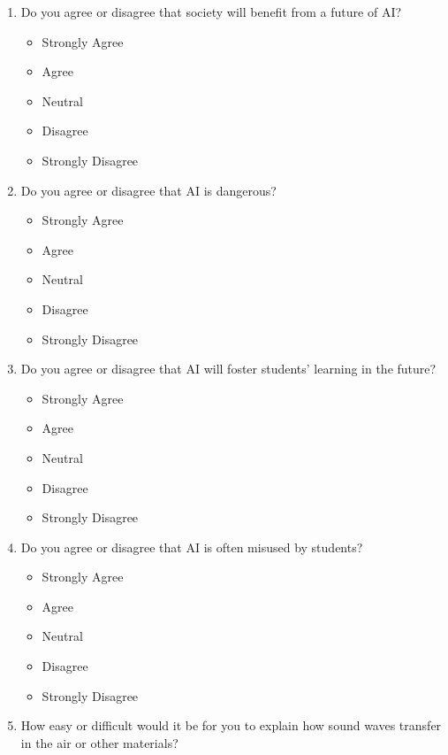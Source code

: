 \documentclass[
  12pt, %
]{article}
\providecommand{\tightlist}{%
  \setlength{\itemsep}{0pt}\setlength{\parskip}{0pt}}
\begin{document}
\begin{enumerate}
\def\labelenumi{\arabic{enumi}.}
\item
  Do you agree or disagree that society will benefit from a future of AI?

  \begin{itemize}
  \tightlist
  \item
    Strongly Agree
  \item
    Agree
  \item
    Neutral
  \item
    Disagree
  \item
    Strongly Disagree
  \end{itemize}
\item
  Do you agree or disagree that AI is dangerous?

  \begin{itemize}
  \tightlist
  \item
    Strongly Agree
  \item
    Agree
  \item
    Neutral
  \item
    Disagree
  \item
    Strongly Disagree
  \end{itemize}
\item
  Do you agree or disagree that AI will foster students' learning in the future?

  \begin{itemize}
  \tightlist
  \item
    Strongly Agree
  \item
    Agree
  \item
    Neutral
  \item
    Disagree
  \item
    Strongly Disagree
  \end{itemize}
\item
  Do you agree or disagree that AI is often misused by students?

  \begin{itemize}
  \tightlist
  \item
    Strongly Agree
  \item
    Agree
  \item
    Neutral
  \item
    Disagree
  \item
    Strongly Disagree
  \end{itemize}
\item
  How easy or difficult would it be for you to explain how sound waves transfer in the air or other materials?


\end{enumerate}
\end{document}
